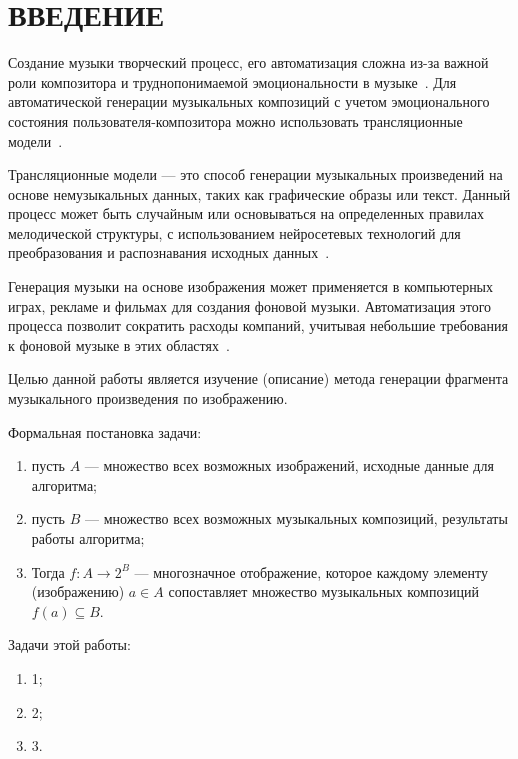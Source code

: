\chapter*{ВВЕДЕНИЕ}

Создание музыки творческий процесс, его автоматизация сложна из-за важной роли композитора и труднопонимаемой эмоциональности в музыке~\cite{big}.
Для автоматической генерации музыкальных композиций с учетом эмоционального состояния пользователя-композитора можно использовать трансляционные модели~\cite{web}.

Трансляционные модели --- это способ генерации музыкальных произведений на основе немузыкальных данных, таких как графические образы или текст.
Данный процесс может быть случайным или основываться на определенных правилах мелодической структуры, с использованием нейросетевых технологий для преобразования и распознавания исходных данных~\cite{translation}.

Генерация музыки на основе изображения может применяется в компьютерных играх, рекламе и фильмах для создания фоновой музыки. 
Автоматизация этого процесса позволит сократить расходы компаний, учитывая небольшие требования к фоновой музыке в этих областях~\cite{actuality}.

Целью данной работы является изучение (описание) метода генерации фрагмента музыкального произведения по изображению.

Формальная постановка задачи: 
\begin{enumerate}
	\item пусть $A$ --- множество всех возможных изображений, исходные данные для алгоритма;
	\item пусть $B$ --- множество всех возможных музыкальных композиций, результаты работы алгоритма;
    \item Тогда $f: A \rightarrow 2^B$ --- многозначное отображение, которое каждому элементу (изображению) $a \in A$ сопоставляет множество музыкальных композиций $f(a) \subseteq B$.
\end{enumerate}

Задачи этой работы:
\begin{enumerate}
	\item 1;
	\item 2;
	\item 3.
\end{enumerate}

